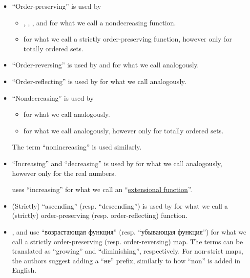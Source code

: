 \begin{remark}
\begin{itemize}
    \item \enquote{Order-preserving} is used by
    \begin{itemize}
       \item {}, , ,  and  for what we call a nondecreasing function.

       \item {} for what we call a strictly order-preserving function, however only for totally ordered sets.
    \end{itemize}

    \item \enquote{Order-reversing} is used by  and  for what we call analogously.

    \item \enquote{Order-reflecting} is used by  for what we call analogously.

    \item \enquote{Nondecreasing} is used by
    \begin{itemize}
      \item {} for what we call analogously.
      \item {} for what we call analogously, however only for totally ordered sets.
    \end{itemize}

    The term \enquote{nonincreasing} is used similarly.

    \item \enquote{Increasing} and \enquote{decreasing} is used by  for what we call analogously, however only for the real numbers.

     uses \enquote{increasing} for what we call an \enquote{\hyperref[def:extensive_function]{extensional function}}.

    \item (Strictly) \enquote{ascending} (resp. \enquote{descending}) is used by  for what we call a (strictly) order-preserving (resp. order-reflecting) function.

    \item {},  and  use \enquote{возрастающая функция} (resp. \enquote{убывающая функция}) for what we call a strictly order-preserving (resp. order-reversing) map. The terms can be translated as \enquote{growing} and \enquote{diminishing}, respectively. For non-strict maps, the authors suggest adding a \enquote{не} prefix, similarly to how \enquote{non} is added in English.
  \end{itemize}
\end{remark}

